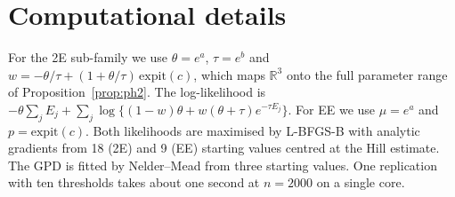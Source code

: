 \documentclass[12pt]{article}
\theoremstyle{definition}
\theoremstyle{remark}
\begin{document}
\section{Computational details}\label{app:computing}

For the 2E sub-family we use $\theta=e^{a}$, $\tau=e^{b}$ and $w=-\theta/\tau+(1+\theta/\tau)\,\mathrm{expit}(c)$, which maps $\mathbb R^3$ onto the full parameter range of Proposition~\ref{prop:ph2}. The log-likelihood is $-\theta\sum_jE_j+\sum_j\log\{(1-w)\theta+w(\theta+\tau)e^{-\tau E_j}\}$. For EE we use $\mu=e^{a}$ and $p=\mathrm{expit}(c)$. Both likelihoods are maximised by L-BFGS-B with analytic gradients from 18 (2E) and 9 (EE) starting values centred at the Hill estimate. The GPD is fitted by Nelder--Mead from three starting values. One replication with ten thresholds takes about one second at $n=2000$ on a single core.
\end{document}
